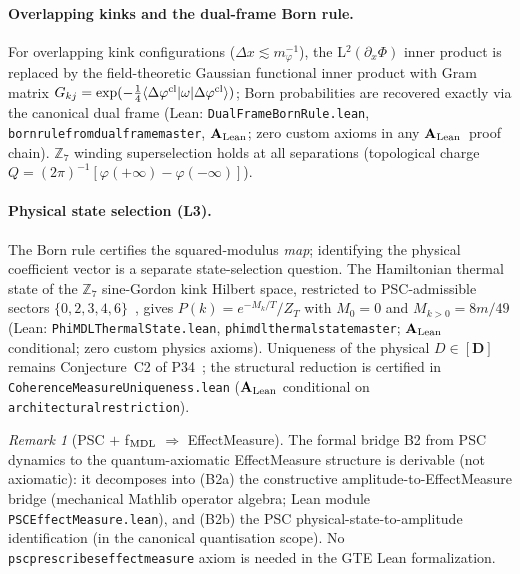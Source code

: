 \documentclass[11pt]{article}
\theoremstyle{remark}
\newtheorem{remark}[theorem]{Remark}
\newcommand{\ZS}{\mathbb{Z}_7}
\newcommand{\lean}[1]{%
  \penalty-100
  \begingroup\def\_{\textunderscore\allowbreak}\texttt{#1}\endgroup}
\newcommand{\CatAL}{\ensuremath{\textbf{A}_{\rm Lean}}}
\begin{document}
\paragraph{Overlapping kinks and the dual-frame Born rule.}
For overlapping kink configurations ($\Delta x \lesssim m_\varphi^{-1}$),
the L$^2(\partial_x\Phi)$ inner product is replaced by the field-theoretic
Gaussian functional inner product with Gram matrix
$G_{kj}=\exp(-\tfrac{1}{4}\langle\Delta\varphi^{\rm cl}|\omega|
\Delta\varphi^{\rm cl}\rangle)$; Born probabilities are recovered exactly
via the canonical dual frame (Lean: \lean{DualFrameBornRule.lean},
\lean{born\_rule\_from\_dual\_frame\_master}, \CatAL{}; zero custom axioms in any \CatAL\ proof chain).
$\ZS$ winding superselection holds at all separations (topological charge
$Q=(2\pi)^{-1}[\varphi(+\infty)-\varphi(-\infty)]$).

\paragraph{Physical state selection (L3).}
The Born rule certifies the squared-modulus \emph{map}; identifying the
physical coefficient vector is a separate state-selection question.
The Hamiltonian thermal state of the $\ZS$ sine-Gordon kink Hilbert space,
restricted to PSC-admissible sectors $\{0,2,3,4,6\}$~\cite{SpivackMirrorBraidAtlas,SpivackPhiMDLField}, gives
$P(k)=e^{-M_k/T}/Z_T$ with $M_0=0$ and $M_{k>0}=8m/49$
(Lean: \lean{PhiMDLThermalState.lean}, \lean{phimdl\_thermal\_state\_master};
\CatAL{} conditional; zero custom physics axioms).
Uniqueness of the physical $D\in[\mathbf{D}]$ remains Conjecture~C2 of
P34~\cite{SpivackGTEMobius}; the structural reduction is certified in
\lean{CoherenceMeasureUniqueness.lean} (\CatAL{} conditional on
\lean{architectural\_restriction}).

\begin{remark}[PSC $+$ f$_{\rm MDL}$ $\Rightarrow$ EffectMeasure]
  The formal bridge B2 from PSC dynamics to the quantum-axiomatic
  EffectMeasure structure is derivable (not axiomatic): it decomposes into
  (B2a) the constructive amplitude-to-EffectMeasure bridge (mechanical Mathlib
  operator algebra; Lean module \lean{PSCEffectMeasure.lean}), and (B2b) the
  PSC physical-state-to-amplitude identification (in the canonical quantisation
  scope).  No \lean{psc\_prescribes\_effect\_measure} axiom is needed in the
  GTE Lean formalization.
\end{remark}

\end{document}
